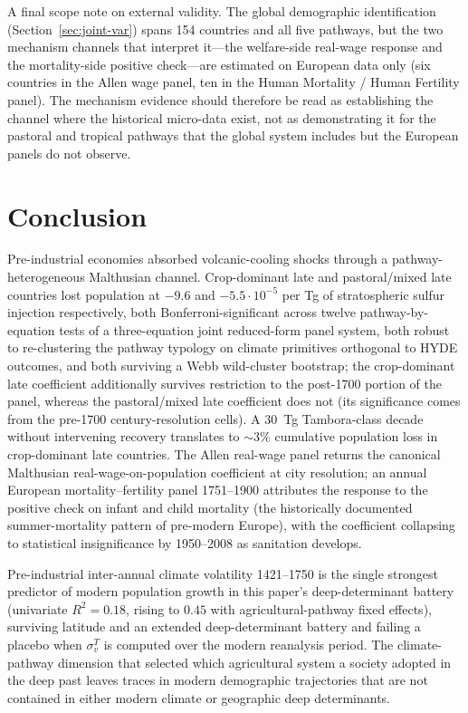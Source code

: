 \documentclass[11pt,letterpaper]{article}
\begin{document}
A final scope note on external validity. The global demographic identification (Section~\ref{sec:joint-var}) spans 154 countries and all five pathways, but the two mechanism channels that interpret it---the welfare-side real-wage response and the mortality-side positive check---are estimated on European data only (six countries in the Allen wage panel, ten in the Human Mortality / Human Fertility panel). The mechanism evidence should therefore be read as establishing the channel where the historical micro-data exist, not as demonstrating it for the pastoral and tropical pathways that the global system includes but the European panels do not observe.

\section{Conclusion}
\label{sec:conclusion}

Pre-industrial economies absorbed volcanic-cooling shocks through a pathway-heterogeneous Malthusian channel. Crop-dominant late and pastoral/mixed late countries lost population at $-9.6$ and $-5.5\!\cdot\!10^{-5}$ per Tg of stratospheric sulfur injection respectively, both Bonferroni-significant across twelve pathway-by-equation tests of a three-equation joint reduced-form panel system, both robust to re-clustering the pathway typology on climate primitives orthogonal to HYDE outcomes, and both surviving a Webb wild-cluster bootstrap; the crop-dominant late coefficient additionally survives restriction to the post-1700 portion of the panel, whereas the pastoral/mixed late coefficient does not (its significance comes from the pre-1700 century-resolution cells). A 30~Tg Tambora-class decade without intervening recovery translates to $\sim 3\%$ cumulative population loss in crop-dominant late countries. The Allen real-wage panel returns the canonical Malthusian real-wage-on-population coefficient at city resolution; an annual European mortality--fertility panel 1751--1900 attributes the response to the positive check on infant and child mortality (the historically documented summer-mortality pattern of pre-modern Europe), with the coefficient collapsing to statistical insignificance by 1950--2008 as sanitation develops.

Pre-industrial inter-annual climate volatility 1421--1750 is the single strongest predictor of modern population growth in this paper's deep-determinant battery (univariate $R^2 = 0.18$, rising to $0.45$ with agricultural-pathway fixed effects), surviving latitude and an extended deep-determinant battery and failing a placebo when $\sigma_v^T$ is computed over the modern reanalysis period. The climate-pathway dimension that selected which agricultural system a society adopted in the deep past leaves traces in modern demographic trajectories that are not contained in either modern climate or geographic deep determinants.
\end{document}
